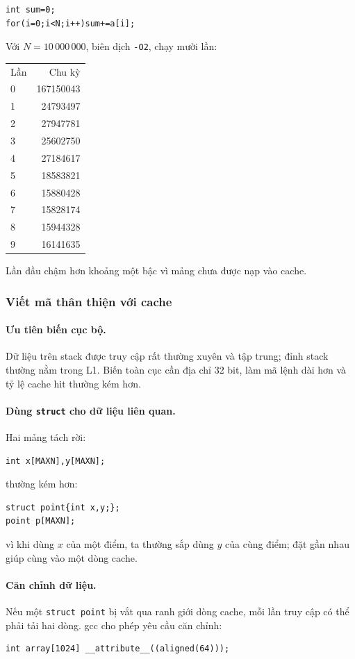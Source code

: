 \documentclass[11pt]{article}
\begin{document}
\begin{verbatim}
int sum=0;
for(i=0;i<N;i++)sum+=a[i];
\end{verbatim}
Với \(N=10\,000\,000\), biên dịch \texttt{-O2}, chạy mười lần:
\begin{center}
\begin{tabular}{lr}
Lần & Chu kỳ\\
0 & 167150043\\
1 & 24793497\\
2 & 27947781\\
3 & 25602750\\
4 & 27184617\\
5 & 18583821\\
6 & 15880428\\
7 & 15828174\\
8 & 15944328\\
9 & 16141635
\end{tabular}
\end{center}
Lần đầu chậm hơn khoảng một bậc vì mảng chưa được nạp vào cache.

\subsubsection{Viết mã thân thiện với cache}

\paragraph{Ưu tiên biến cục bộ.}
Dữ liệu trên stack được truy cập rất thường xuyên và tập trung; đỉnh stack
thường nằm trong L1. Biến toàn cục cần địa chỉ 32 bit, làm mã lệnh dài hơn và
tỷ lệ cache hit thường kém hơn.

\paragraph{Dùng \texttt{struct} cho dữ liệu liên quan.}
Hai mảng tách rời:
\begin{verbatim}
int x[MAXN],y[MAXN];
\end{verbatim}
thường kém hơn:
\begin{verbatim}
struct point{int x,y;};
point p[MAXN];
\end{verbatim}
vì khi dùng \(x\) của một điểm, ta thường sắp dùng \(y\) của cùng điểm; đặt
gần nhau giúp cùng vào một dòng cache.

\paragraph{Căn chỉnh dữ liệu.}
Nếu một \texttt{struct point} bị vắt qua ranh giới dòng cache, mỗi lần truy
cập có thể phải tải hai dòng. gcc cho phép yêu cầu căn chỉnh:
\begin{verbatim}
int array[1024] __attribute__((aligned(64)));
\end{verbatim}
\end{document}
